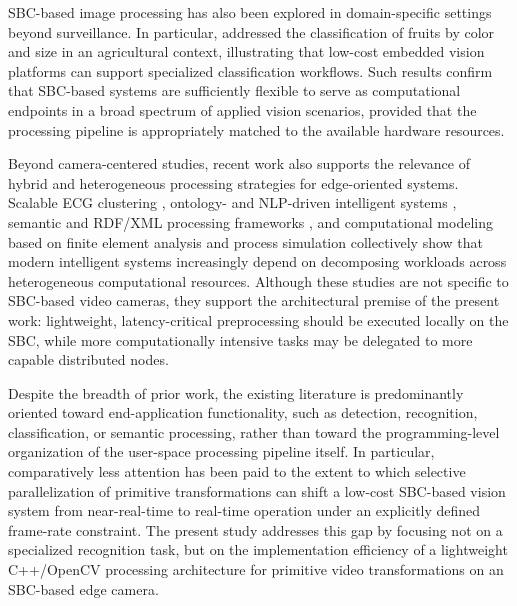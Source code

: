\documentclass[
]{ceurart}
\begin{document}
SBC-based image processing has also been explored in domain-specific settings beyond surveillance. In particular, \cite{Mustaffa_Khairul_2017} addressed the classification of fruits by color and size in an agricultural context, illustrating that low-cost embedded vision platforms can support specialized classification workflows. Such results confirm that SBC-based systems are sufficiently flexible to serve as computational endpoints in a broad spectrum of applied vision scenarios, provided that the processing pipeline is appropriately matched to the available hardware resources.

Beyond camera-centered studies, recent work also supports the relevance of hybrid and heterogeneous processing strategies for edge-oriented systems. Scalable ECG clustering \cite{Kaverinskiy_Chaikovsky_Mnevets_Ryzhenko_Bocharov_Malakhov_2025}, ontology- and NLP-driven intelligent systems \cite{Litvin_Velychko_Kaverinskiy_2020, Litvin_Velychko_Kaverinskiy_2022, Litvin_Palagin_Kaverinskiy_Malakhov_2023}, semantic and RDF/XML processing frameworks \cite{Palagin_Petrenko_Kaverinskiy_Malakhov_2025, Palagin_Petrenko_Malakhov_2024}, and computational modeling based on finite element analysis and process simulation \cite{Kaverinskiy_Bagliuk_Sukhenko_Verbylo_2025, Bagliuk_Kaverinskiy_2026} collectively show that modern intelligent systems increasingly depend on decomposing workloads across heterogeneous computational resources. Although these studies are not specific to SBC-based video cameras, they support the architectural premise of the present work: lightweight, latency-critical preprocessing should be executed locally on the SBC, while more computationally intensive tasks may be delegated to more capable distributed nodes.

Despite the breadth of prior work, the existing literature is predominantly oriented toward end-application functionality, such as detection, recognition, classification, or semantic processing, rather than toward the programming-level organization of the user-space processing pipeline itself. In particular, comparatively less attention has been paid to the extent to which selective parallelization of primitive transformations can shift a low-cost SBC-based vision system from near-real-time to real-time operation under an explicitly defined frame-rate constraint. The present study addresses this gap by focusing not on a specialized recognition task, but on the implementation efficiency of a lightweight C++/OpenCV processing architecture for primitive video transformations on an SBC-based edge camera.
\end{document}

